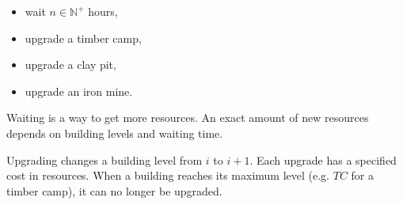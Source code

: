 \documentclass[12pt, a4paper, twocolumn]{article}
\begin{document}
\begin{itemize}
  \item wait \(n \in \mathbb{N}^+\) hours,
  \item upgrade a timber camp,
  \item upgrade a clay pit,
  \item upgrade an iron mine.
\end{itemize}

Waiting is a way to get more resources.
An exact amount of new resources depends on building levels and waiting time.

Upgrading changes a building level from \(i\) to \(i + 1\).
Each upgrade has a specified cost in resources.
When a building reaches its maximum level (e.g. \(TC\) for a timber camp), it can no longer be upgraded.

\end{document}
